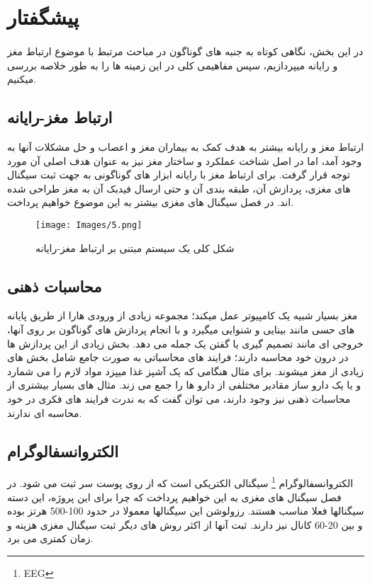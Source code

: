 \documentclass[11pt]{extarticle}
\begin{document}
\clearpage
\newpage

\tableofcontents %

\clearpage
\newpage

\section{پیشگفتار}
\paragraph{}
در این بخش، نگاهی کوتاه به جنبه های گوناگون در مباحث مرتبط با موضوع ارتباط مغز و رایانه میپردازیم، سپس مفاهیمی کلی در این زمینه ها را به طور خلاصه بررسی میکنیم.
\subsection{ارتباط مغز-رایانه}
ارتباط مغز و رایانه بیشتر به هدف کمک به بیماران مغز و اعصاب و حل مشکلات آنها به وجود آمد، اما در اصل شناخت عملکرد و ساختار مغز نیز به عنوان هدف اصلی آن مورد توجه قرار گرفت. برای ارتباط مغز با رایانه ابزار های گوناگونی به جهت ثبت سیگنال های مغزی، پردازش آن، طبقه بندی آن و حتی ارسال فیدبک آن به مغز طراحی شده اند. در فصل سیگنال های مغزی بیشتر به این موضوع خواهیم پرداخت.

\begin{figure}[h!]
	\centering
	\texttt{[image: Images/5.png]}
	\caption{شکل کلی یک سیستم مبتنی بر ارتباط مغز-رایانه}
	\label{fig:1}
\end{figure}

\subsection{محاسبات ذهنی}
مغز بسیار شبیه یک کامپیوتر عمل میکند؛ مجموعه زیادی از ورودی هارا از طریق پایانه های حسی مانند بینایی و شنوایی میگیرد و با انجام پردازش های گوناگون بر روی آنها، خروجی ای مانند تصمیم گیری یا گفتن یک جمله می دهد. بخش زیادی از این پردازش ها در درون خود محاسبه دارند؛ 
فرایند های محاسباتی به صورت جامع شامل بخش های زیادی از مغز میشوند. برای مثال هنگامی که یک آشپز غذا میپزد مواد لازم را می شمارد و یا یک دارو ساز مقادیر مختلفی از دارو ها را جمع می زند. مثال های بسیار بیشتری از محاسبات ذهنی نیز وجود دارند، می توان گفت که به ندرت فرایند های فکری در خود محاسبه ای ندارند.
\subsection{الکتروانسفالوگرام}
الکتروانسفالوگرام
\footnote{EEG}
سیگنالی الکتریکی است که از روی پوست سر ثبت می شود. در فصل سیگنال های مغزی به این خواهیم پرداخت که چرا برای این پروژه، این دسته سیگنالها فعلا مناسب هستند. رزولوشن این سیگنالها معمولا در حدود 100-500 هرتز بوده و بین 20-60 کانال نیز دارند. ثبت آنها از اکثر روش های دیگر ثبت سیگنال مغزی هزینه و زمان کمتری می برد.
\end{document}
